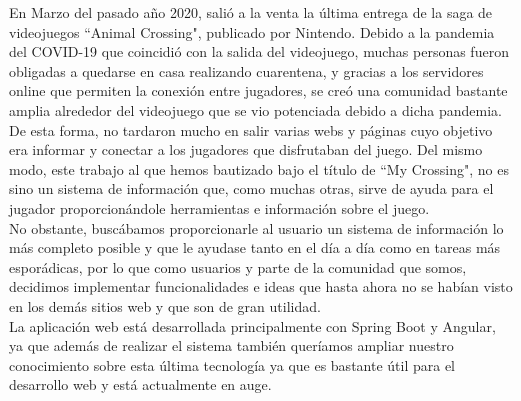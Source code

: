 
En Marzo del pasado año 2020, salió a la venta la última entrega de la saga de videojuegos ``Animal Crossing", publicado por Nintendo. Debido a la pandemia del COVID-19 que coincidió con la salida del videojuego, muchas personas fueron obligadas a quedarse en casa realizando cuarentena, y gracias a los servidores online que permiten la conexión entre jugadores, se creó una comunidad bastante amplia alrededor del videojuego que se vio potenciada debido a dicha pandemia.\\

De esta forma, no tardaron mucho en salir varias webs y páginas cuyo objetivo era informar y conectar a los jugadores que disfrutaban del juego. Del mismo modo, este trabajo al que hemos bautizado bajo el título de ``My Crossing", no es sino un sistema de información que, como muchas otras, sirve de ayuda para el jugador proporcionándole herramientas e información sobre el juego.\\

No obstante, buscábamos proporcionarle al usuario un sistema de información lo más completo posible y que le ayudase tanto en el día a día como en tareas más esporádicas, por lo que como usuarios y parte de la comunidad que somos, decidimos implementar funcionalidades e ideas que hasta ahora no se habían visto en los demás sitios web y que son de gran utilidad.\\

La aplicación web está desarrollada principalmente con Spring Boot y Angular, ya que además de realizar el sistema también queríamos ampliar nuestro conocimiento sobre esta última tecnología ya que es bastante útil para el desarrollo web y está actualmente en auge.

